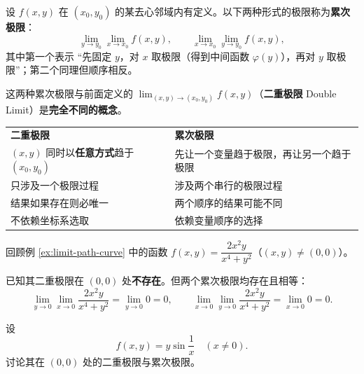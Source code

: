 \documentclass[lang=cn,11pt]{elegantbook}
\begin{document}
\begin{definition} \label{def:iterated-limit}
设 $f(x,y)$ 在 $(x_0,y_0)$ 的某去心邻域内有定义。以下两种形式的极限称为\textbf{累次极限}：
\[
\lim_{y\to y_0}\lim_{x\to x_0}f(x,y),\qquad
\lim_{x\to x_0}\lim_{y\to y_0}f(x,y),
\]
其中第一个表示 ``先固定 $y$，对 $x$ 取极限（得到中间函数 $\varphi(y)$），再对 $y$ 取极限''；第二个同理但顺序相反。

这两种累次极限与前面定义的 $\displaystyle\lim_{(x,y)\to(x_0,y_0)}f(x,y)$（\textbf{二重极限} Double Limit）是\textbf{完全不同的概念}。
\end{definition}

\begin{note}[两者的区别]
\begin{center}
\renewcommand{\arraystretch}{1.4}
\begin{tabular}{@{}p{4.8cm}p{7cm}@{}}
\textbf{二重极限} & \textbf{累次极限} \\
$(x,y)$ 同时以\textbf{任意方式}趋于 $(x_0,y_0)$ & 先让一个变量趋于极限，再让另一个趋于极限 \\
只涉及一个极限过程 & 涉及两个串行的极限过程 \\
结果如果存在则必唯一 & 两个顺序的结果可能不同 \\
不依赖坐标系选取 & 依赖变量顺序的选择 \\
\end{tabular}
\end{center}
\end{note}

\begin{exercise}[二重极限不存在但累次极限存在] \label{ex:iterated-exists-double-no}
回顾例 \ref{ex:limit-path-curve} 中的函数 $f(x,y)=\dfrac{2x^2y}{x^4+y^2}$（$(x,y) \neq (0,0)$）。

已知其二重极限在 $(0,0)$ 处\textbf{不存在}。但两个累次极限均存在且相等：
\[
\lim_{y\to 0}\lim_{x\to 0}\frac{2x^2y}{x^4+y^2}=\lim_{y\to 0}0=0,
\qquad
\lim_{x\to 0}\lim_{y\to 0}\frac{2x^2y}{x^4+y^2}=\lim_{x\to 0}0=0.
\]
\end{exercise}

\begin{exercise}[二重极限存在但累次极限不全存在] \label{ex:double-exists-iterated-partial}
设
\[
f(x,y)=y\sin\frac1x\quad(x \neq 0).
\]
讨论其在 $(0,0)$ 处的二重极限与累次极限。
\end{exercise}
\end{document}
